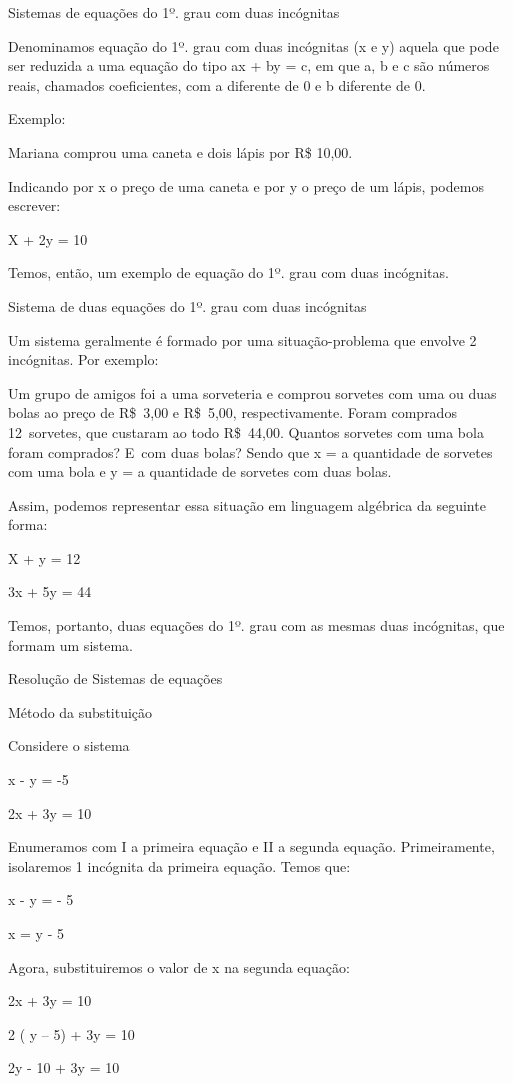 {Sistemas de equações do 1º. grau com duas incógnitas

Denominamos equação do 1º. grau com duas incógnitas (x e y) aquela que
pode ser reduzida a uma equação do tipo ax + by = c, em que a, b e c são
números reais, chamados coeficientes, com a diferente de 0 e b diferente
de 0.

Exemplo:

Mariana comprou uma caneta e dois lápis por R\$ 10,00.

Indicando por x o preço de uma caneta e por y o preço de um lápis,
podemos escrever:

X + 2y = 10

Temos, então, um exemplo de equação do 1º. grau com duas incógnitas.

Sistema de duas equações do 1º. grau com duas incógnitas

Um sistema geralmente é formado por uma situação-problema que envolve 2
incógnitas. Por exemplo:

Um grupo de amigos foi a uma sorveteria e comprou sorvetes com uma ou
duas bolas ao preço de R\$~3,00 e R\$~5,00, respectivamente. Foram
comprados 12~sorvetes, que custaram ao todo R\$~44,00. Quantos sorvetes
com uma bola foram comprados? E~com duas bolas? Sendo que x = a
quantidade de sorvetes com uma bola e y = a quantidade de sorvetes com
duas bolas.

Assim, podemos representar essa situação em linguagem algébrica da
seguinte forma:

X + y = 12

3x + 5y = 44

Temos, portanto, duas equações do 1º. grau com as mesmas duas
incógnitas, que formam um sistema.

Resolução de Sistemas de equações

Método da substituição

Considere o sistema

x - y = -5

2x + 3y = 10

Enumeramos com I a primeira equação e II a segunda equação.
Primeiramente, isolaremos 1 incógnita da primeira equação. Temos que:

x - y = - 5

x = y - 5

Agora, substituiremos o valor de x na segunda equação:

2x + 3y = 10

2 ( y -- 5) + 3y = 10

2y - 10 + 3y = 10

}
